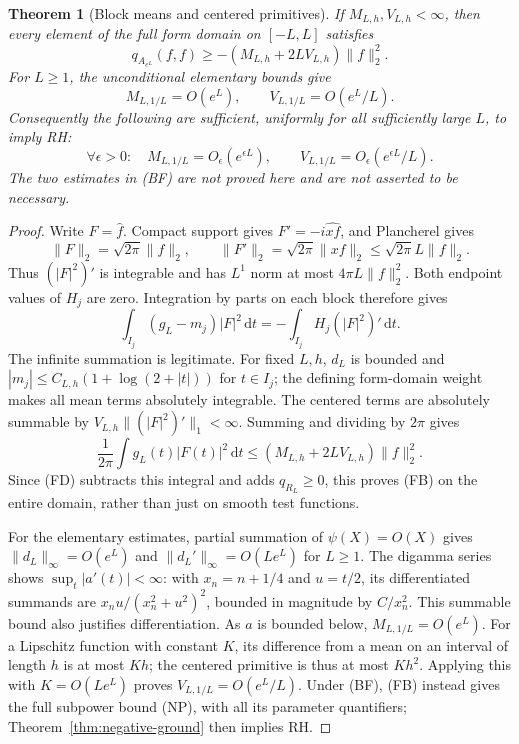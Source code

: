 \documentclass[11pt]{article}
\newtheorem{theorem}{Theorem}
\theoremstyle{remark}\newtheorem{remark}[theorem]{Remark}
\newcommand{\dd}{\,\mathrm d}
\begin{document}
\begin{theorem}[Block means and centered primitives]
\label{thm:frequency-blocks}
If $M_{L,h},V_{L,h}<\infty$, then every element of the full
form domain on $[-L,L]$ satisfies
\[
 q_{A_{e^L}}(f,f)\ge
          -(M_{L,h}+2LV_{L,h})\|f\|_2^2.                 \tag{FB}
\]
For $L\ge1$, the unconditional elementary bounds give
\[
 M_{L,1/L}=O(e^L),\qquad V_{L,1/L}=O(e^L/L).
\]
Consequently the following are sufficient, uniformly for
all sufficiently large $L$, to imply RH:
\[
 \forall\epsilon>0:\quad
 M_{L,1/L}=O_\epsilon(e^{\epsilon L}),\qquad
 V_{L,1/L}=O_\epsilon(e^{\epsilon L}/L).                 \tag{BF}
\]
The two estimates in (BF) are not proved here and are not
asserted to be necessary.
\end{theorem}
\begin{proof}
Write $F=\widehat f$. Compact support gives
$F'=-i\widehat{xf}$, and Plancherel gives
\[
 \|F\|_2=\sqrt{2\pi}\|f\|_2,
 \qquad \|F'\|_2=\sqrt{2\pi}\|xf\|_2
                        \le\sqrt{2\pi}L\|f\|_2.
\]
Thus $(|F|^2)'$ is integrable and has $L^1$ norm at most
$4\pi L\|f\|_2^2$. Both endpoint values of $H_j$ are zero.
Integration by parts on each block therefore gives
\[
 \int_{I_j}(g_L-m_j)|F|^2\dd t
                  =-\int_{I_j}H_j(|F|^2)'\dd t.
\]
The infinite summation is legitimate. For fixed $L,h$,
$d_L$ is bounded and
$|m_j|\le C_{L,h}(1+\log(2+|t|))$ for $t\in I_j$;
the defining form-domain weight makes all mean terms
absolutely integrable. The centered terms are absolutely
summable by $V_{L,h}\|(|F|^2)'\|_1<\infty$.
Summing and dividing by $2\pi$ gives
\[
 \frac1{2\pi}\int g_L(t)|F(t)|^2\dd t
          \le(M_{L,h}+2LV_{L,h})\|f\|_2^2.
\]
Since (FD) subtracts this integral and adds $q_{R_L}\ge0$,
this proves (FB) on the entire domain, rather than just
on smooth test functions.

For the elementary estimates, partial summation of
$\psi(X)=O(X)$ gives
$\|d_L\|_\infty=O(e^L)$ and
$\|d_L'\|_\infty=O(Le^L)$ for $L\ge1$.
The digamma series shows $\sup_t|a'(t)|<\infty$:
with $x_n=n+1/4$ and $u=t/2$, its differentiated summands
are $x_nu/(x_n^2+u^2)^2$, bounded in magnitude by
$C/x_n^2$. This summable bound also justifies differentiation.
As $a$ is bounded below, $M_{L,1/L}=O(e^L)$.
For a Lipschitz function with constant $K$, its difference
from a mean on an interval of length $h$ is at most $Kh$;
the centered primitive is thus at most $Kh^2$.
Applying this with $K=O(Le^L)$ proves
$V_{L,1/L}=O(e^L/L)$. Under (BF), (FB) instead gives
the full subpower bound (NP), with all its parameter
quantifiers; Theorem~\ref{thm:negative-ground} then implies RH.
\end{proof}
\end{document}
